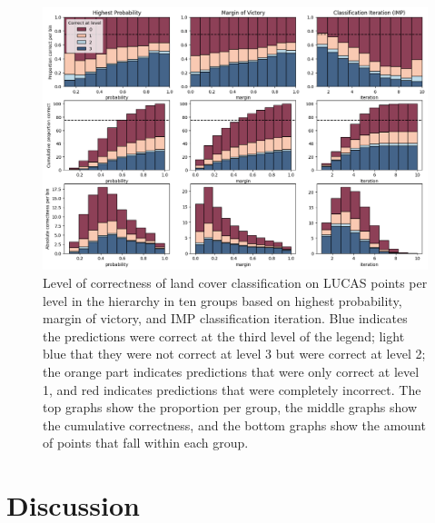          \begin{figure}
            \centering
            \includegraphics[width=\linewidth]{figs_05/fig_calibration_lucas.png}
            \caption{Level of correctness of land cover classification on LUCAS points per level in the hierarchy in ten groups based on highest probability, margin of victory, and IMP classification iteration. 
            Blue indicates the predictions were correct at the third level of the legend; light blue that they were not correct at level 3 but were correct at level 2; the orange part indicates predictions that were only correct at level 1, and red indicates predictions that were completely incorrect.
            The top graphs show the proportion per group, the middle graphs show the cumulative correctness, and the bottom graphs show the amount of points that fall within each group.}
            \label{fig:05_comparison_metrics_lucas}
        \end{figure}

\section{Discussion}

        
